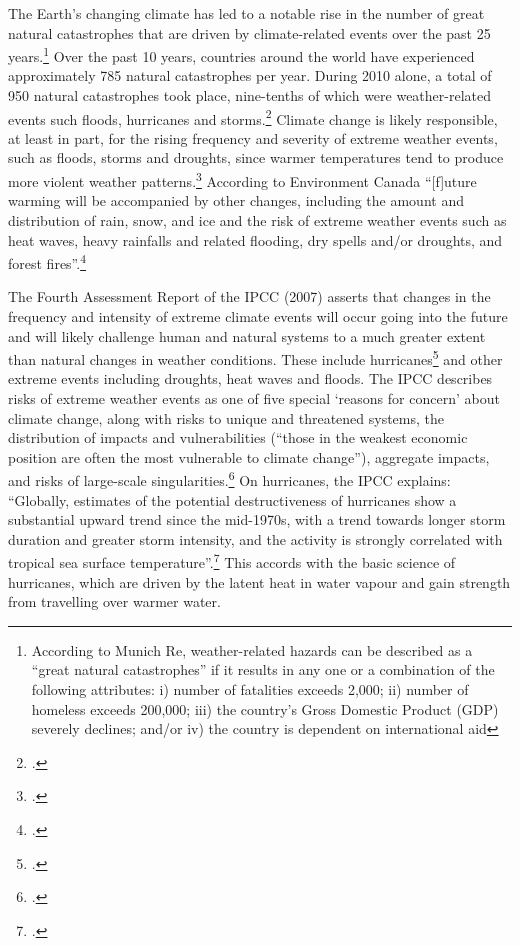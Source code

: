 The Earth's changing climate has led to a notable rise in the number of great natural catastrophes that are driven by climate-related events over the past 25 years.\footnote{According to Munich Re, weather-related hazards can be described as a ``great natural catastrophes'' if it results in any one or a combination of the following attributes: i) number of fatalities exceeds 2,000; ii) number of homeless exceeds 200,000; iii) the country’s Gross Domestic Product (GDP) severely declines; and/or iv) the country is dependent on international aid}
Over the past 10 years, countries around the world have experienced approximately 785 natural catastrophes per year. 
During 2010 alone, a total of 950 natural catastrophes took place, nine-tenths of which were weather-related events such floods, hurricanes and storms.\footcite[][]{MunichRECatast}
Climate change is likely responsible, at least in part, for the rising frequency and severity of extreme weather events, such as floods, storms and droughts, since warmer temperatures tend to produce more violent weather patterns.\footcite[See: ][]{IPCCHurricane}
According to Environment Canada ``[f]uture warming will be accompanied by other changes, including the amount and distribution of rain, snow, and ice and the risk of extreme weather events such as heat waves, heavy rainfalls and related flooding, dry spells and/or droughts, and forest fires''.\footcite[][]{ECImpactsOfCC}



The Fourth Assessment Report of the IPCC (2007) asserts that changes in the frequency and intensity of extreme climate events will occur going into the future and will likely challenge human and natural systems to a much greater extent than natural changes in weather conditions.
These include hurricanes\footcite[][]{Knutson2004} and other extreme events including droughts, heat waves and floods.
The IPCC describes risks of extreme weather events as one of five special `reasons for concern' about climate change, along with risks to unique and threatened systems, the distribution of impacts and vulnerabilities (``those in the weakest economic position are often the most vulnerable to climate change''), aggregate impacts, and risks of large-scale singularities.\footcite[][See: "The long-term perspective" \url{https://www.ipcc.ch/publications_and_data/ar4/syr/en/spms5.html}"]{IPCC2007}
On hurricanes, the IPCC explains: ``Globally, estimates of the potential destructiveness of hurricanes show a substantial upward trend since the mid-1970s, with a trend towards longer storm duration and greater storm intensity, and the activity is strongly correlated with tropical sea surface temperature''.\footcite[][]{IPCCHurricane}
This accords with the basic science of hurricanes, which are driven by the latent heat in water vapour and gain strength from travelling over warmer water.



